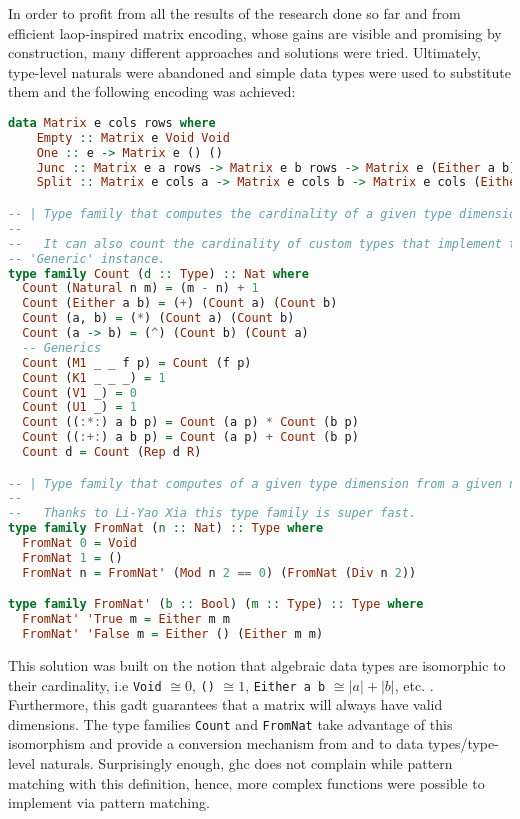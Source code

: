 \documentclass[
  oneside,
  11pt, a4paper,
  footinclude=true,
  headinclude=true,
  cleardoublepage=empty
]{scrbook}
\theoremstyle{definition}
\theoremstyle{definition}
\begin{document}
	    In order to profit from all the results of the research done so far and from efficient \gls{laop}-inspired matrix encoding, whose gains are visible and promising by construction, many different approaches and solutions were tried. Ultimately, type-level naturals were abandoned and simple data types were used to substitute them and the following encoding was achieved:
	    
        \begin{lstlisting}[language=Haskell,label={lst:type-fam}, caption={Inductive Matrix definition},captionpos=b]
data Matrix e cols rows where
    Empty :: Matrix e Void Void
    One :: e -> Matrix e () ()
    Junc :: Matrix e a rows -> Matrix e b rows -> Matrix e (Either a b) rows
    Split :: Matrix e cols a -> Matrix e cols b -> Matrix e cols (Either a b)

-- | Type family that computes the cardinality of a given type dimension.
--
--   It can also count the cardinality of custom types that implement the
-- 'Generic' instance.
type family Count (d :: Type) :: Nat where
  Count (Natural n m) = (m - n) + 1
  Count (Either a b) = (+) (Count a) (Count b)
  Count (a, b) = (*) (Count a) (Count b)
  Count (a -> b) = (^) (Count b) (Count a)
  -- Generics
  Count (M1 _ _ f p) = Count (f p)
  Count (K1 _ _ _) = 1
  Count (V1 _) = 0
  Count (U1 _) = 1
  Count ((:*:) a b p) = Count (a p) * Count (b p)
  Count ((:+:) a b p) = Count (a p) + Count (b p)
  Count d = Count (Rep d R)

-- | Type family that computes of a given type dimension from a given natural
--
--   Thanks to Li-Yao Xia this type family is super fast.
type family FromNat (n :: Nat) :: Type where
  FromNat 0 = Void
  FromNat 1 = ()
  FromNat n = FromNat' (Mod n 2 == 0) (FromNat (Div n 2))

type family FromNat' (b :: Bool) (m :: Type) :: Type where
  FromNat' 'True m = Either m m
  FromNat' 'False m = Either () (Either m m)
        \end{lstlisting}{}
	    
	    This solution was built on the notion that algebraic data types are isomorphic to their cardinality, i.e \texttt{Void} $ \cong 0$, \texttt{()} $\cong 1$, \texttt{Either a b} $\cong |a| + |b|$, etc. . Furthermore, this \gls{gadt} guarantees that a matrix will always have valid dimensions. The type families \texttt{Count} and \texttt{FromNat} take advantage of this isomorphism and provide a conversion mechanism from and to data types/type-level naturals. Surprisingly enough, \gls{ghc} does not complain while pattern matching with this definition, hence, more complex functions were possible to implement via pattern matching.
	    
\end{document}
